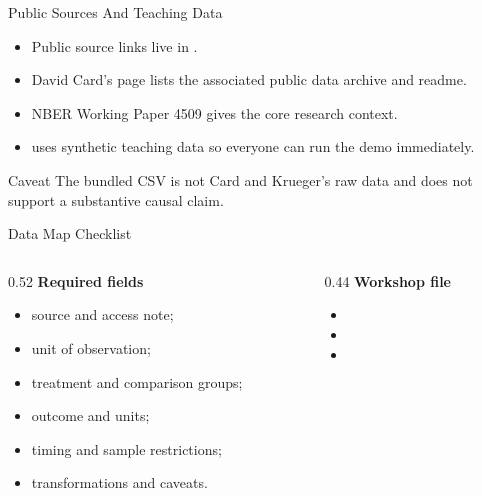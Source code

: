 \begin{frame}{Public Sources And Teaching Data}
  \begin{itemize}
    \item Public source links live in .
    \item David Card's page lists the associated public data archive and readme.
    \item NBER Working Paper 4509 gives the core research context.
    \item {} uses synthetic teaching data so everyone can run the demo immediately.
  \end{itemize}
  \vspace{0.4em}
  \begin{block}{Caveat}
    The bundled CSV is not Card and Krueger's raw data and does not support a
    substantive causal claim.
  \end{block}
\end{frame}

\begin{frame}{Data Map Checklist}
  \begin{columns}[T,onlytextwidth]
    \begin{column}{0.52\textwidth}
      \textbf{Required fields}
      \begin{itemize}
        \item source and access note;
        \item unit of observation;
        \item treatment and comparison groups;
        \item outcome and units;
        \item timing and sample restrictions;
        \item transformations and caveats.
      \end{itemize}
    \end{column}
    \begin{column}{0.44\textwidth}
      \textbf{Workshop file}
      \begin{itemize}
        \item {}
        \item {}
        \item {}
      \end{itemize}
    \end{column}
  \end{columns}
\end{frame}

